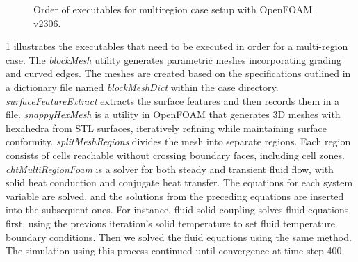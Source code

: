 \begin{figure}[tbh]
\centering
{}

\caption[OF Executable]{Order of executables for multiregion case setup with OpenFOAM v2306.}
\label{fig:order-of-executables}
\end{figure}






\ref{fig:order-of-executables} illustrates the executables that need to be executed in order for a multi-region case.
The \textit{blockMesh} utility generates parametric meshes incorporating grading and curved edges. 
The meshes are created based on the specifications outlined in a dictionary file named \textit{blockMeshDict}  within the case directory.
\textit{surfaceFeatureExtract} extracts the surface features and then records them in a file.      
\textit{snappyHexMesh} is a utility in OpenFOAM that generates 3D meshes with hexahedra from STL surfaces, iteratively refining while maintaining surface conformity.
\textit{splitMeshRegions} divides the mesh into separate regions. Each region consists of cells reachable without crossing boundary faces, including cell zones.
\textit{chtMultiRegionFoam} is a solver for both steady and transient fluid flow, with solid heat conduction and conjugate heat transfer. The equations for each system variable are solved, and the solutions from the preceding equations are inserted into the subsequent ones. For instance, fluid-solid coupling solves fluid equations first, using the previous iteration's solid temperature to set fluid temperature boundary conditions. Then we solved the fluid equations using the same method. The simulation using this process continued until convergence at time step 400.
    



